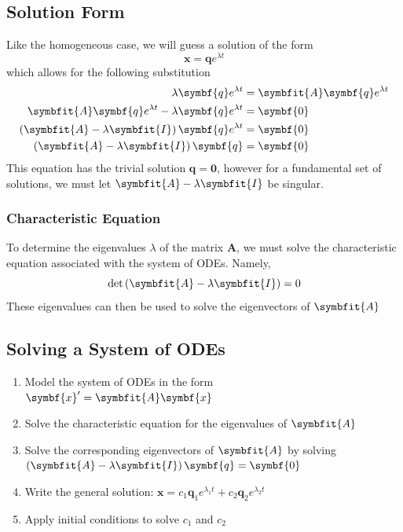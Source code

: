 \documentclass{article}
\begin{document}
\subsection{Solution Form}
Like the homogeneous case, we will guess a solution of the form
\begin{equation*}
    \symbf{x} = \symbf{q}e^{\lambda t}
\end{equation*}
which allows for the following substitution
\begin{align*}
    \lambda \symbf{q}e^{\lambda t}                                         & = \symbfit{A} \symbf{q}e^{\lambda t} \\
    \symbfit{A} \symbf{q}e^{\lambda t} - \lambda \symbf{q}e^{\lambda t}    & = \symbf{0}                          \\
    \left( \symbfit{A} - \lambda\symbfit{I} \right) \symbf{q}e^{\lambda t} & = \symbf{0}                          \\
    \left( \symbfit{A} - \lambda\symbfit{I} \right) \symbf{q}              & = \symbf{0}
\end{align*}
This equation has the trivial solution \(\symbf{q}=\symbf{0}\), however for a fundamental set of solutions,
we must let \(\symbfit{A} - \lambda\symbfit{I}\) be singular.
\subsubsection{Characteristic Equation}
To determine the eigenvalues \(\lambda \) of the matrix \(\symbf{A}\), we must solve the characteristic equation
associated with the system of ODEs. Namely,
\begin{equation*}
    \det{\left( \symbfit{A} - \lambda\symbfit{I} \right)} = 0
\end{equation*}
These eigenvalues can then be used to solve the eigenvectors of \(\symbfit{A}\)
\subsection{Solving a System of ODEs}
\begin{enumerate}
    \item Model the system of ODEs in the form \(\symbf{x}' = \symbfit{A} \symbf{x}\)
    \item Solve the characteristic equation for the eigenvalues of \(\symbfit{A}\)
    \item Solve the corresponding eigenvectors of \(\symbfit{A}\) by solving \(\left( \symbfit{A} - \lambda\symbfit{I} \right) \symbf{q} = \symbf{0}\)
    \item Write the general solution: \(\symbf{x} = c_1\symbf{q}_1e^{\lambda_1 t} + c_2\symbf{q}_2e^{\lambda_2 t}\)
    \item Apply initial conditions to solve \(c_1\) and \(c_2\)
\end{enumerate}
\end{document}
